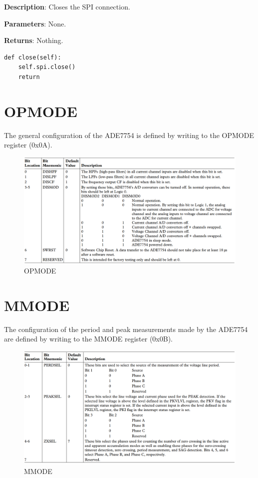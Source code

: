 \documentclass{scrartcl}  %
\begin{document}
\textbf{Description}: Closes the SPI connection.

\textbf{Parameters}: None.

\textbf{Returns}: Nothing.

\begin{lstlisting}
def close(self):
	self.spi.close()
	return
\end{lstlisting}

\section{OPMODE}
The general configuration of the ADE7754 is defined by writing to the OPMODE register (0x0A).
\begin{figure}[H]
\centering
\includegraphics[width=1\textwidth]{opmode.png}
\caption{OPMODE}\label{fig:myFigure1}
\end{figure}

\newpage

\section{MMODE}
The configuration of the period and peak measurements made by the ADE7754 are defined by writing to the MMODE register (0x0B).
\begin{figure}[H]
\centering
\includegraphics[width=1\textwidth]{mmode.png}
\caption{MMODE}\label{fig:myFigure2}
\end{figure}

\newpage
\listoffigures
\end{document}
